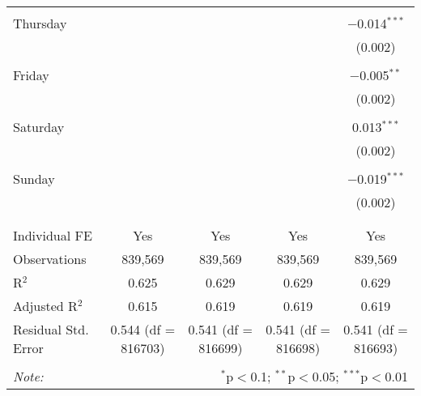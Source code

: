 \documentclass[
]{article}
\begin{document}
\begin{table}[!htbp]
{\begin{tabular}{@{\extracolsep{5pt}}lcccc}
  & & & & \\ 
 Thursday &  &  &  & $-$0.014$^{***}$ \\ 
  &  &  &  & (0.002) \\ 
  & & & & \\ 
 Friday &  &  &  & $-$0.005$^{**}$ \\ 
  &  &  &  & (0.002) \\ 
  & & & & \\ 
 Saturday &  &  &  & 0.013$^{***}$ \\ 
  &  &  &  & (0.002) \\ 
  & & & & \\ 
 Sunday &  &  &  & $-$0.019$^{***}$ \\ 
  &  &  &  & (0.002) \\ 
  & & & & \\ 
\hline \\[-1.8ex] 
Individual FE & Yes & Yes & Yes & Yes \\ 
Observations & 839,569 & 839,569 & 839,569 & 839,569 \\ 
R$^{2}$ & 0.625 & 0.629 & 0.629 & 0.629 \\ 
Adjusted R$^{2}$ & 0.615 & 0.619 & 0.619 & 0.619 \\ 
Residual Std. Error & 0.544 (df = 816703) & 0.541 (df = 816699) & 0.541 (df = 816698) & 0.541 (df = 816693) \\ 
\hline 
\hline \\[-1.8ex] 
\textit{Note:}  & \multicolumn{4}{r}{$^{*}$p$<$0.1; $^{**}$p$<$0.05; $^{***}$p$<$0.01} \\ 
\end{tabular}
} 
\end{table} 
\newpage
\end{document}
